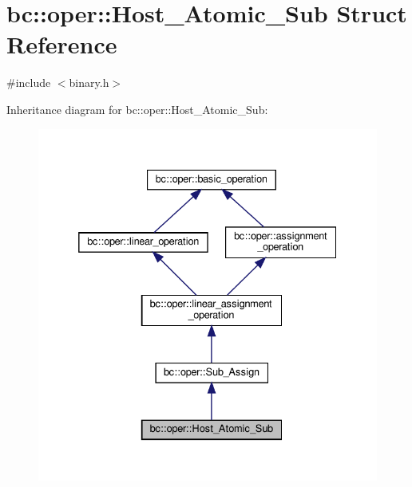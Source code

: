 \hypertarget{structbc_1_1oper_1_1Host__Atomic__Sub}{}\section{bc\+:\+:oper\+:\+:Host\+\_\+\+Atomic\+\_\+\+Sub Struct Reference}
\label{structbc_1_1oper_1_1Host__Atomic__Sub}


{\ttfamily \#include $<$binary.\+h$>$}



Inheritance diagram for bc\+:\+:oper\+:\+:Host\+\_\+\+Atomic\+\_\+\+Sub\+:\nopagebreak
\begin{figure}[H]
\begin{center}
\leavevmode
\includegraphics[width=332pt]{structbc_1_1oper_1_1Host__Atomic__Sub__inherit__graph}
\end{center}
\end{figure}


